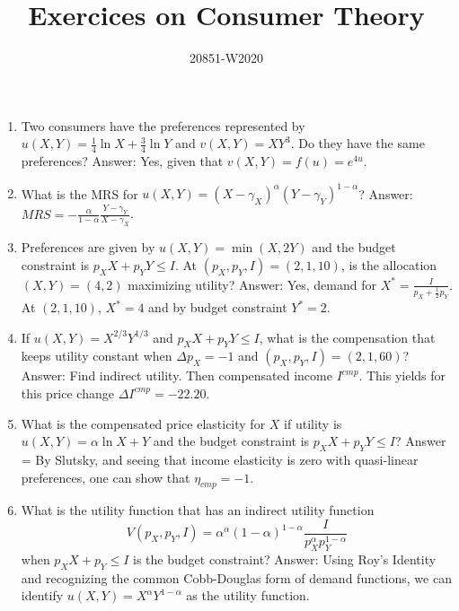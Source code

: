 \documentclass[11pt, oneside,french]{article}   	%
\title{Exercices on Consumer Theory}
\author{20851-W2020}
\date{}							%
\begin{document}
\maketitle

\begin{enumerate}
    \item Two consumers have the preferences represented by $u(X,Y) = \frac{1}{4}\ln X + \frac{3}{4} \ln Y$ and $v(X,Y) = XY^3$. Do they have the same preferences? Answer: Yes, given that $v(X,Y) = f(u) = e^{4u}$. 
    \item What is the MRS for $u(X,Y) = (X-\gamma_X)^\alpha (Y-\gamma_Y)^{1-\alpha}$? Answer: $MRS = -\frac{\alpha}{1-\alpha}\frac{Y-\gamma_Y}{X-\gamma_X}$.
    \item Preferences are given by $u(X,Y) = \min(X,2Y)$ and the budget constraint is $p_X X + p_Y Y \leq I$. At $(p_X,p_Y,I) = (2,1,10)$, is the allocation $(X,Y) = (4,2)$ maximizing utility? Answer: Yes, demand for $X^* = \frac{I}{p_X + \frac{1}{2}p_Y}$. At $(2,1,10)$, $X^* = 4$ and by budget constraint $Y^*=2$.
    \item If $u(X,Y) = X^{2/3}Y^{1/3}$ and $p_X X + p_Y Y \leq I$, what is the compensation that keeps utility constant when $\Delta p_X = -1$ and $(p_X,p_Y,I) = (2,1,60)$? Answer: Find indirect utility. Then compensated income $I^{cmp}$. This yields for this price change $\Delta I^{cmp} = -22.20$.
    \item What is the compensated price elasticity for $X$ if utility is $u(X,Y) = \alpha \ln X + Y$ and the budget constraint is $p_X X + p_Y Y \leq I$? Answer = By Slutsky, and seeing that income elasticity is zero with quasi-linear preferences, one can show that $\eta_{cmp} = -1$.
    \item What is the utility function that has an indirect utility function $$V(p_X,p_Y,I) = \alpha^\alpha (1-\alpha)^{1-\alpha} \frac{I}{p_X^{\alpha} p_Y^{1-\alpha}} $$ when $p_X X + p_Y \leq I$ is the budget constraint? Answer: Using Roy's Identity and recognizing the common Cobb-Douglas form of demand functions, we can identify $u(X,Y) = X^{\alpha} Y^{1-\alpha}$ as the utility function.
    
\end{enumerate}
\end{document}
